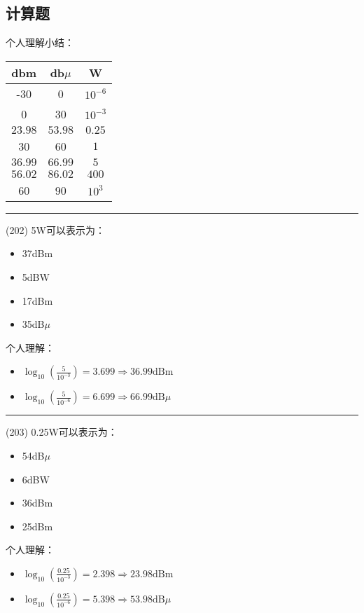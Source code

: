 \documentclass[twocolumn,hyperref,UTF8]{ctexart}  %
\begin{document}
\clearpage
\subsection{计算题}

个人理解小结：
\begin{table}[htb]
	\begin{center}
		\begin{tabular}{cc|c}
			\hline
			dbm  &  db$\mu$  &  W \\
			\hline
			-30      &  0        &  $10^{-6}$ \\
			 0       &  30       &  $10^{-3}$ \\
			$23.98$  &  $53.98$  &  $0.25$ \\
			30       &  60       &  $1      $ \\
			$36.99$  &  $66.99$  &  $5$ \\
			$56.02$  &  $86.02$  &  $400$ \\
			60       &  90       &  $10^3   $ \\
			\hline
		\end{tabular}
	\end{center}
\end{table}


\noindent\rule{0.5\textwidth}{1pt}
\heiti (202) 5W可以表示为： \songti {\color{gray} [LK0566] }
\begin{itemize}
	\item  37dBm
	\item  5dBW
	\item  17dBm
	\item  35dB$\mu$  %
\end{itemize}
个人理解：
\begin{itemize}
	\item  $\log_{10}(\frac{5}{10^{-3}}) = 3.699  \Longrightarrow  36.99 \text{dBm}$
	\item  $\log_{10}(\frac{5}{10^{-6}}) = 6.699  \Longrightarrow  66.99 \text{dB}\mu$
\end{itemize}


\noindent\rule{0.5\textwidth}{1pt}
\heiti (203) 0.25W可以表示为： \songti {\color{gray} [LK0567] }
\begin{itemize}
	\item  54dB$\mu$  %
	\item  6dBW
	\item  36dBm
	\item  25dBm
\end{itemize}
个人理解：
\begin{itemize}
	\item  $\log_{10}(\frac{0.25}{10^{-3}}) = 2.398  \Longrightarrow  23.98 \text{dBm}$
	\item  $\log_{10}(\frac{0.25}{10^{-6}}) = 5.398  \Longrightarrow  53.98 \text{dB}\mu$
\end{itemize}
\end{document}
